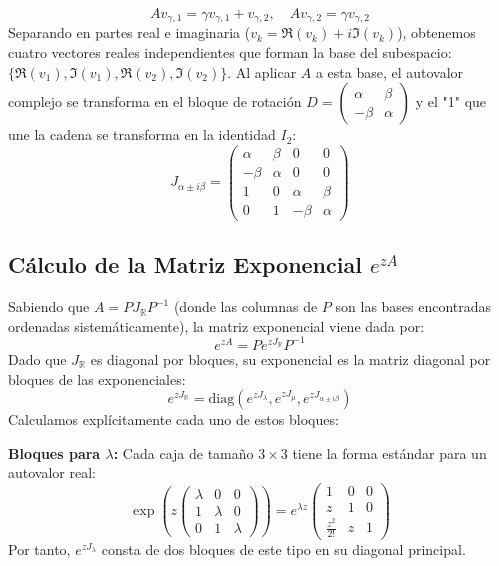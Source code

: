 {\begin{itemize}
        \[
            A v_{\gamma,1} = \gamma v_{\gamma,1} + v_{\gamma,2}, \quad A v_{\gamma,2} = \gamma v_{\gamma,2}
        \]
        Separando en partes real e imaginaria ($v_k = \Re(v_k) + i\Im(v_k)$), obtenemos cuatro vectores reales independientes que forman la base del subespacio: $\{\Re(v_1), \Im(v_1), \Re(v_2), \Im(v_2)\}$. Al aplicar $A$ a esta base, el autovalor complejo se transforma en el bloque de rotación $D = \begin{pmatrix} \alpha & \beta \\ -\beta & \alpha \end{pmatrix}$ y el "1" que une la cadena se transforma en la identidad $I_2$:
        \[
            J_{\alpha \pm i\beta} = 
            \begin{pmatrix} 
                \alpha & \beta & 0 & 0 \\ 
                -\beta & \alpha & 0 & 0 \\ 
                1 & 0 & \alpha & \beta \\ 
                0 & 1 & -\beta & \alpha 
            \end{pmatrix}
        \]
    \end{itemize}

    \subsection*{Cálculo de la Matriz Exponencial $e^{zA}$}

    Sabiendo que $A = P J_\mathbb{R} P^{-1}$ (donde las columnas de $P$ son las bases encontradas ordenadas sistemáticamente), la matriz exponencial viene dada por:
    \[
        e^{zA} = P e^{z J_\mathbb{R}} P^{-1}
    \]
    Dado que $J_\mathbb{R}$ es diagonal por bloques, su exponencial es la matriz diagonal por bloques de las exponenciales:
    \[
        e^{z J_\mathbb{R}} = \text{diag}\left( e^{z J_\lambda}, e^{z J_\mu}, e^{z J_{\alpha \pm i\beta}} \right)
    \]
    Calculamos explícitamente cada uno de estos bloques:

    \textbf{Bloques para $\lambda$:} 
    Cada caja de tamaño $3 \times 3$ tiene la forma estándar para un autovalor real:
    \[
        \exp\left( z \begin{pmatrix} \lambda & 0 & 0 \\ 1 & \lambda & 0 \\ 0 & 1 & \lambda \end{pmatrix} \right) = 
        e^{\lambda z} \begin{pmatrix} 
            1 & 0 & 0 \\ 
            z & 1 & 0 \\ 
            \frac{z^2}{2!} & z & 1 
        \end{pmatrix}
    \]
    Por tanto, $e^{z J_\lambda}$ consta de dos bloques de este tipo en su diagonal principal.

}
